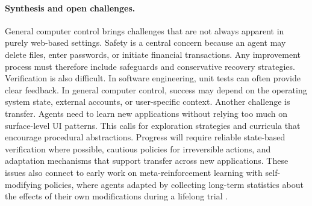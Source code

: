 \paragraph{Synthesis and open challenges.}
General computer control brings challenges that are not always apparent in purely web-based settings. Safety is a central concern because an agent may delete files, enter passwords, or initiate financial transactions. Any improvement process must therefore include safeguards and conservative recovery strategies. Verification is also difficult. In software engineering, unit tests can often provide clear feedback. In general computer control, success may depend on the operating system state, external accounts, or user-specific context. Another challenge is transfer. Agents need to learn new applications without relying too much on surface-level UI patterns. This calls for exploration strategies and curricula that encourage procedural abstractions. Progress will require reliable state-based verification where possible, cautious policies for irreversible actions, and adaptation mechanisms that support transfer across new applications. These issues also connect to early work on meta-reinforcement learning with self-modifying policies, where agents adapted by collecting long-term statistics about the effects of their own modifications during a lifelong trial \citep{Schmidhuber1994OnLH, schmidhuber1997shifting, schmidhuber1998reinforcement, schmidhuber1999general, schmidhuber2006goedelmachinesselfreferentialuniversal}.

